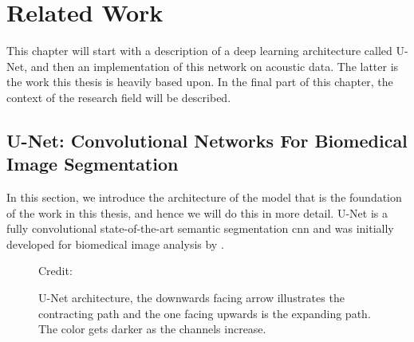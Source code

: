 \chapter{Related Work}
This chapter will start with a description of a deep learning architecture called U-Net, and then an implementation of this network on acoustic data. The latter is the work this thesis is heavily based upon. In the final part of this chapter, the context of the research field will be described.


\section{U-Net: Convolutional Networks For Biomedical
Image Segmentation} \label{unet}

    In this section, we introduce the architecture of the model that is the foundation of the work in this thesis, and hence we will do this in more detail. U-Net is a fully convolutional state-of-the-art\cite{rajak2021segmentation} semantic segmentation \gls{cnn} and was initially developed for biomedical image analysis by \citeauthor{unet_ronneberger2015}\cite{unet_ronneberger2015}. 
    
    \begin{figure}[H]
        \centering
        
        \caption[U-Net architecture]{U-Net architecture, the downwards facing arrow illustrates the contracting path and the one facing upwards is the expanding path. The color gets darker as the channels increase.}
      	\medskip 
        \label{unet_fig}
        \hspace*{15pt}\hbox{\scriptsize Credit: \citeauthor{unet_ronneberger2015}\cite{unet_ronneberger2015}}
    \end{figure}
    

